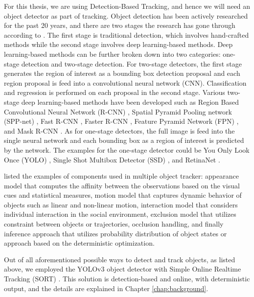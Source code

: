 For this thesis, we are using Detection-Based Tracking, and hence we will need an object detector as part of tracking. Object detection has been actively researched for the past 20 years, and there are two stages the research has gone through according to \citeauthor{zou_object_2019} \cite{zou_object_2019}. The first stage is traditional detection, which involves hand-crafted methods while the second stage involves deep learning-based methods. Deep learning-based methods can be further broken down into two categories: one-stage detection and two-stage detection. For two-stage detectors, the first stage generates the region of interest as a bounding box detection proposal and each region proposal is feed into a convolutional neural network (CNN). Classification and regression is performed on each proposal in the second stage. Various two-stage deep learning-based methods have been developed such as Region Based Convolutional Neural Network (R-CNN) \cite{girshick_rich_2014}, Spatial Pyramid Pooling network (SPP-net) \cite{he_spatial_2015}, Fast R-CNN \cite{girshick_fast_2015}, Faster R-CNN \cite{ren_faster_2017}, Feature Pyramid Network (FPN) \cite{lin_feature_2017}, and Mask R-CNN \cite{he_mask_2017}. As for one-stage detectors, the full image is feed into the single neural network and each bounding box as a region of interest is predicted by the network. The examples for the one-stage detector could be You Only Look Once (YOLO) \cite{redmon_you_2016}, Single Shot Multibox Detector (SSD) \cite{liu_ssd_2016}, and RetinaNet \cite{lin_focal_2017}.

\citeauthor{luo_multiple_2021} \cite{luo_multiple_2021} listed the examples of components used in multiple object tracker: appearance model that computes the affinity between the observations based on the visual cues and statistical measures, motion model that captures dynamic behavior of objects such as linear and non-linear motion, interaction model that considers individual interaction in the social environment, exclusion model that utilizes constraint between objects or trajectories, occlusion handling, and finally inference approach that utilizes probability distribution of object states or approach based on the deterministic optimization.

Out of all aforementioned possible ways to detect and track objects, as listed above, we employed the YOLOv3 object detector \cite{redmon_yolov3_2018} with Simple Online Realtime Tracking (SORT) \cite{bewley_simple_2016}. This solution is detection-based and online, with deterministic output, and the details are explained in Chapter \ref{chap:background}.
